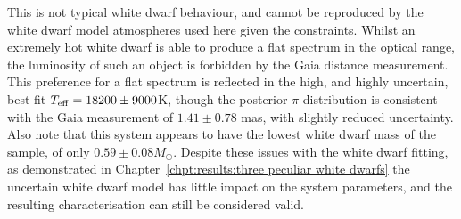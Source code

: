 This is not typical white dwarf behaviour, and cannot be reproduced by the white dwarf model atmospheres used here given the constraints. Whilst an extremely hot white dwarf is able to produce a flat spectrum in the optical range, the luminosity of such an object is forbidden by the Gaia distance measurement.
This preference for a flat spectrum is reflected in the high, and highly uncertain, best fit $T_{\rm eff} = 18200 \pm 9000$K, though the posterior $\pi$ distribution is consistent with the Gaia measurement of $1.41\pm0.78$ mas, with slightly reduced uncertainty. Also note that this system appears to have the lowest white dwarf mass of the sample, of only $0.59\pm0.08 M_\odot$.
Despite these issues with the white dwarf fitting, as demonstrated in Chapter~\ref{chpt:results:three peculiar white dwarfs} the uncertain white dwarf model has little impact on the system parameters, and the resulting characterisation can still be considered valid.


%     


